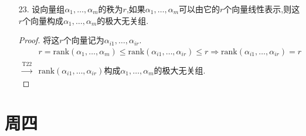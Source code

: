 \documentclass{article}
\begin{document}
\begin{enumerate}
    \begin{proof}
        设有任何$r$个线性无关的向量$\alpha_{i1},\ldots,\alpha_{ir}$构成一个向量组$S_1$,$\forall\ \alpha_{j}\notin S_1,S_2=S_1\cup \left\{\alpha_{j}\right\}$.
        \[
            r+1>r=\mbox{rank}(\alpha_1,\ldots,\alpha_m)
            \Rightarrow
            S_2\mbox{线性相关},\mbox{又}S_1\mbox{线性无关}
            \Rightarrow
            S_1\mbox{构成}\alpha_1,\ldots,\alpha_m\mbox{的极大无关组}.
        \]
    \end{proof}
    \item [23.]设向量组$\alpha_1,\ldots,\alpha_m$的秩为$r$,如果$\alpha_1,\ldots,\alpha_m$可以由它的$r$个向量线性表示,则这$r$个向量构成$\alpha_1,\ldots,\alpha_m$的极大无关组.
    \begin{proof}将这$r$个向量记为$\alpha_{i1},\ldots,\alpha_{ir}$.
        \begin{align*}
            & r=\mbox{rank}(\alpha_1,\ldots,\alpha_m)
            \leqslant
            \mbox{rank}(\alpha_{i1},\ldots,\alpha_{ir})
            \leqslant r
            \Rightarrow
            \mbox{rank}(\alpha_{i1},\ldots,\alpha_{ir})=r\\
            \xrightarrow{\mbox{T22结论}}
            & \mbox{rank}(\alpha_{i1},\ldots,\alpha_{ir})\mbox{构成}
            \alpha_1,\ldots,\alpha_m\mbox{的极大无关组}.
        \end{align*}
    \end{proof}
\end{enumerate}
\section{周四}
\end{document}
